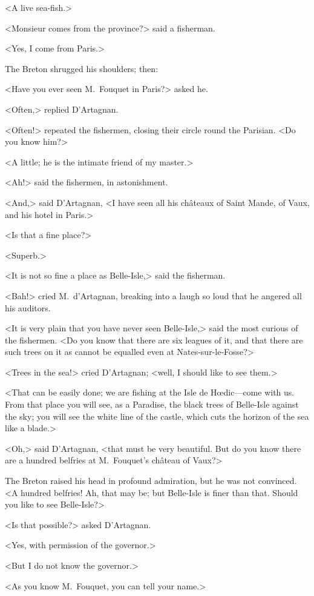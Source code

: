 <A live sea-fish.>

<Monsieur comes from the province?> said a fisherman.

<Yes, I come from Paris.>

The Breton shrugged his shoulders; then:

<Have you ever seen M.~Fouquet in Paris?> asked he.

<Often,> replied D'Artagnan.

<Often!> repeated the fishermen, closing their circle round the Parisian. <Do you know him?>

<A little; he is the intimate friend of my master.>

<Ah!> said the fishermen, in astonishment.

<And,> said D'Artagnan, <I have seen all his châteaux of Saint Mande, of Vaux, and his hotel in Paris.>

<Is that a fine place?>

<Superb.>

<It is not so fine a place as Belle-Isle,> said the fisherman.

<Bah!> cried M.~d'Artagnan, breaking into a laugh so loud that he angered all his auditors.

<It is very plain that you have never seen Belle-Isle,> said the most curious of the fishermen. <Do you know that there are six leagues of it, and that there are such trees on it as cannot be equalled even at Nates-sur-le-Fosse?>

<Trees in the sea!> cried D'Artagnan; <well, I should like to see them.>

<That can be easily done; we are fishing at the Isle de Hœdic—come with us. From that place you will see, as a Paradise, the black trees of Belle-Isle against the sky; you will see the white line of the castle, which cuts the horizon of the sea like a blade.>

<Oh,> said D'Artagnan, <that must be very beautiful. But do you know there are a hundred belfries at M.~Fouquet's château of Vaux?>

The Breton raised his head in profound admiration, but he was not convinced. <A hundred belfries! Ah, that may be; but Belle-Isle is finer than that. Should you like to see Belle-Isle?>

<Is that possible?> asked D'Artagnan.

<Yes, with permission of the governor.>

<But I do not know the governor.>

<As you know M.~Fouquet, you can tell your name.>

